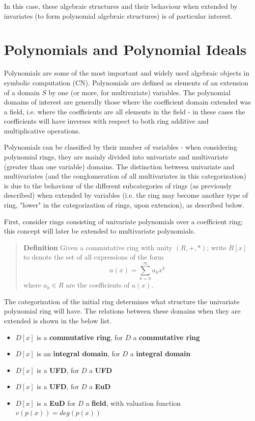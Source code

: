 \documentclass[letterpaper,12pt,titlepage,oneside,final]{book}
\newenvironment{defn}{\begin{quote}%
  \textbf{Definition }%
  \quad
}{%
\end{quote}%
}
\begin{document}
In this case, these algebraic structures and their behaviour when extended by invariates (to form polynomial algebraic structures) is of particular interest.

\section{Polynomials and Polynomial Ideals}

Polynomials are some of the most important and widely used algebraic objects in symbolic computation (CN).  Polynomials are defined as elements of an extension of a domain ${S}$ by one (or more, for multivariate) variables.  The polynomial domains of interest are generally those where the coefficient domain extended was a field, i.e. where the coefficients are all elements in the field - in these cases the coefficients will have inverses with respect to both ring additive and multiplicative operations.  

Polynomials can be classified by their number of variables - when considering polynomial rings, they are mainly divided into univariate and multivariate (greater than one variable) domains.  The distinction between univariate and multivariates (and the conglomeration of all multivariates in this categorization) is due to the behaviour of the different subcategories of rings (as previously described) when extended by variables (i.e. the ring may become another type of ring, "lower" in the categorization of rings, upon extension), as described below.

First, consider rings consisting of univariate polynomials over a coefficient ring; this concept will later be extended to multivariate polynomials.

\begin{defn}\label{defn: Univariate Polynomial Space}
  Given a commutative ring with unity ${(R, +, *)}$; write ${R[x]}$ to denote the set of all expressions of the form
  \begin{equation*}
    a(x) = \sum_{k=0}^{\infty} a_k x^k
  \end{equation*}
  where ${a_k \in R}$ are the coefficients of ${a(x)}$. 
\end{defn}

The categorization of the initial ring determines what structure the univariate polynomial ring will have.  The relations between these domains when they are extended is shown in the below list.
\begin{itemize}
  \item ${D[x]}$ is a \textbf{commutative ring}, for ${D}$ a \textbf{commutative ring} 
  \item ${D[x]}$ is an \textbf{integral domain}, for ${D}$ a \textbf{integral domain} 
  \item ${D[x]}$ is a \textbf{UFD}, for ${D}$ a \textbf{UFD}
  \item ${D[x]}$ is a \textbf{UFD}, for ${D}$ a \textbf{EuD}
  \item ${D[x]}$ is a \textbf{EuD} for ${D}$ a \textbf{field}, with valuation function ${v(p(x)) = deg(p(x))}$ 
\end{itemize}  
\end{document}
